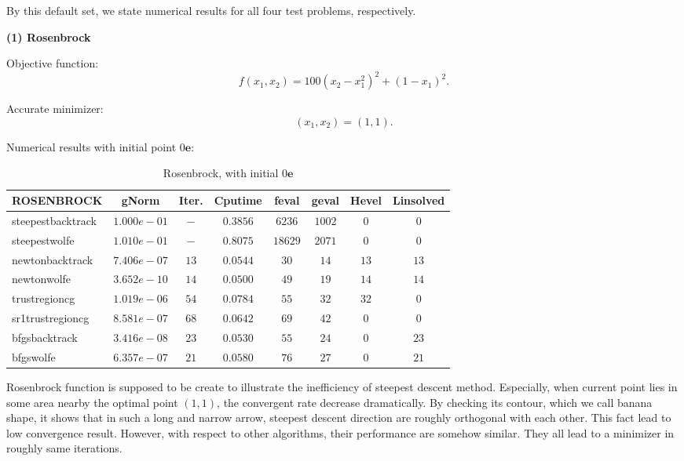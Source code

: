 \documentclass[11pt]{report}
\begin{document}
By this default set, we state numerical results for all four test problems, respectively.

\textbf{(1) Rosenbrock }

Objective function: 
\begin{equation}
    f(x_1,x_2) = 100(x_2-x_1^2)^2+(1-x_1)^2.
\end{equation}

Accurate minimizer:
\begin{equation}
    (x_1,x_2) = (1,1).
\end{equation}

Numerical results with initial point $0\mathbf{e}$:
\begin{table}[H]
    \caption{Rosenbrock, with initial $0\mathbf{e}$}
    \label{tab:Rosenbrock_initial}
    \begin{center}
        \begin{tabular}{l|ccccccc}
\textbf{ROSENBROCK}&    gNorm       &   Iter.  &   Cputime   &   feval&geval&Hevel&Linsolved\\
\hline
steepestbacktrack   &   $1.000e-01 $&   $- $&   $0.3856  $&$6236 $&$1002 $&$0    $&$0    $       \\
steepestwolfe       &   $1.010e-01 $&   $- $&   $0.8075  $&$18629$&$2071 $&$0    $&$0    $       \\
newtonbacktrack     &   $7.406e-07 $&   $13   $&   $0.0544  $&$30   $&$14   $&$13   $&$13   $       \\
newtonwolfe         &   $3.652e-10 $&   $14   $&   $0.0500  $&$49   $&$19   $&$14   $&$14   $       \\
trustregioncg       &   $1.019e-06 $&   $54   $&   $0.0784  $&$55   $&$32   $&$32   $&$0    $       \\
sr1trustregioncg    &   $8.581e-07 $&   $68   $&   $0.0642  $&$69   $&$42   $&$0    $&$0    $       \\
bfgsbacktrack       &   $3.416e-08 $&   $23   $&   $0.0530  $&$55   $&$24   $&$0    $&$23   $       \\
bfgswolfe           &   $6.357e-07 $&   $21   $&   $0.0580  $&$76   $&$27   $&$0    $&$21   $       \\
     \end{tabular}
    \end{center}
\end{table}

Rosenbrock function is supposed to be create to illustrate the inefficiency of steepest descent method. Especially, when current point lies in some area nearby the optimal point $(1,1)$, the convergent rate decrease dramatically. By checking its contour, which we call banana shape, it shows that in such a long and narrow arrow, steepest descent direction are roughly orthogonal with each other. This fact lead to low convergence result. However, with respect to other algorithms, their performance are somehow similar.  They all lead to a minimizer in roughly same iterations.
\end{document}
